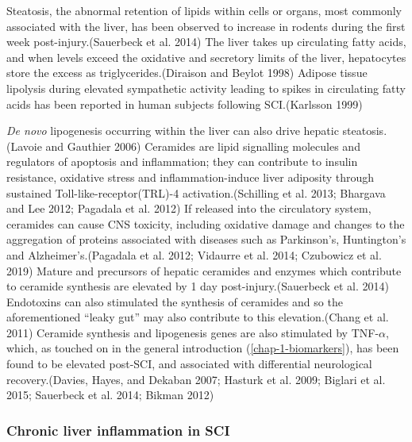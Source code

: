 \documentclass[9pt,lineno]{elife}
\begin{document}
\begin{landscape}
\begin{landscape}
Steatosis, the abnormal retention of lipids within cells or organs, most commonly associated with the liver, has been observed to increase in rodents during the first week post-injury.(Sauerbeck et al. 2014) The liver takes up circulating fatty acids, and when levels exceed the oxidative and secretory limits of the liver, hepatocytes store the excess as triglycerides.(Diraison and Beylot 1998) Adipose tissue lipolysis during elevated sympathetic activity leading to spikes in circulating fatty acids has been reported in human subjects following SCI.(Karlsson 1999)

\emph{De novo} lipogenesis occurring within the liver can also drive hepatic steatosis.(Lavoie and Gauthier 2006) Ceramides are lipid signalling molecules and regulators of apoptosis and inflammation; they can contribute to insulin resistance, oxidative stress and inflammation-induce liver adiposity through sustained Toll-like-receptor(TRL)-4 activation.(Schilling et al. 2013; Bhargava and Lee 2012; Pagadala et al. 2012) If released into the circulatory system, ceramides can cause CNS toxicity, including oxidative damage and changes to the aggregation of proteins associated with diseases such as Parkinson's, Huntington's and Alzheimer's.(Pagadala et al. 2012; Vidaurre et al. 2014; Czubowicz et al. 2019) Mature and precursors of hepatic ceramides and enzymes which contribute to ceramide synthesis are elevated by 1 day post-injury.(Sauerbeck et al. 2014) Endotoxins can also stimulated the synthesis of ceramides and so the aforementioned ``leaky gut'' may also contribute to this elevation.(Chang et al. 2011) Ceramide synthesis and lipogenesis genes are also stimulated by TNF-\(\alpha\), which, as touched on in the general introduction (\ref{chap-1-biomarkers}), has been found to be elevated post-SCI, and associated with differential neurological recovery.(Davies, Hayes, and Dekaban 2007; Hasturk et al. 2009; Biglari et al. 2015; Sauerbeck et al. 2014; Bikman 2012)

\hypertarget{chronic-liver-inflammation-in-sci}{%
\subsubsection{Chronic liver inflammation in SCI}\label{chronic-liver-inflammation-in-sci}}


\end{landscape}
\end{landscape}
\end{document}
